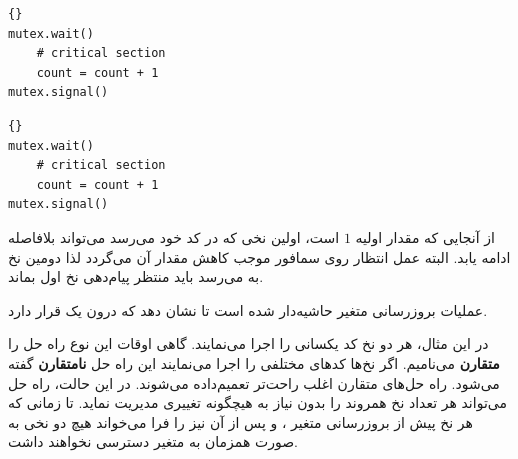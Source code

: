 \documentclass{book}
\begin{document}
\begin{latin}
\begin{minipage}[t]{2in}
\begin{latin}
\begin{lstlisting}[title=\rl{نخ \lr{A}}]{}
mutex.wait()
    # critical section
    count = count + 1
mutex.signal()
\end{lstlisting}
\end{latin}
\end{minipage}
\hfill
\begin{minipage}[t]{2in}
\begin{latin}
\begin{lstlisting}[title=\rl{نخ \lr{B}}]{}
mutex.wait()
    # critical section
    count = count + 1
mutex.signal()
\end{lstlisting}
\end{latin}
\end{minipage}
\end{latin}

    از آنجایی که مقدار اولیه    $1$ است، اولین نخی که  در کد خود می‌رسد می‌تواند بلافاصله ادامه یابد.
    البته عمل انتظار روی سمافور موجب کاهش مقدار آن می‌گردد لذا دومین نخ به   می‌رسد باید منتظر پیام‌دهی نخ اول بماند. 

    عملیات بروزرسانی متغیر حاشیه‌دار شده است تا نشان دهد که درون یک   قرار دارد. 
    
    در این مثال، هر دو نخ کد یکسانی را اجرا می‌نمایند. گاهی اوقات این نوع راه حل را 
    \textbf{متقارن} ‌می‌نامیم. اگر نخ‌ها کدهای مختلفی را اجرا می‌نمایند این راه حل 
    \textbf{نامتقارن}
    گفته می‌شود. راه حل‌های متقارن اغلب راحت‌تر تعمیم‌داده می‌شوند. در این حالت، راه حل   می‌تواند هر تعداد نخ همروند را بدون 
    نیاز به هیچگونه تغییری مدیریت نماید. تا زمانی که هر نخ پیش از بروزرسانی متغیر  ،  و پس از آن نیز    
    را فرا می‌خواند هیچ دو نخی به صورت همزمان به متغیر  دسترسی نخواهند داشت.
\end{document}
